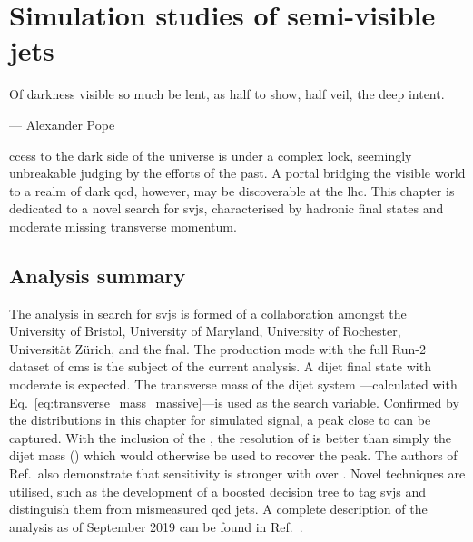 \chapter{Simulation studies of semi-visible jets}
\label{chap:svj}

\epigraph{Of darkness visible so much be lent, as half to show, half veil, the deep intent.}{--- Alexander Pope}

ccess to the dark side of the universe is under a complex lock, seemingly unbreakable judging by the efforts of the past. A portal bridging the visible world to a realm of dark \acrshort{qcd}, however, may be discoverable at the \acrshort{lhc}. This chapter is dedicated to a novel search for \glspl{svj}, characterised by hadronic final states and moderate missing transverse momentum.






\section{Analysis summary}
\label{sec:svj_overview}

The analysis in search for \glspl{svj} is formed of a collaboration amongst the University of Bristol, University of Maryland, University of Rochester, Universit\"{a}t Z\"{u}rich, and the \acrfull{fnal}. The \schannel production mode with the full Run-2 dataset of \acrshort{cms} is the subject of the current analysis. A dijet final state with moderate \ptmiss is expected. The transverse mass of the dijet system \mT---calculated with Eq.~\ref{eq:transverse_mass_massive}---is used as the search variable. Confirmed by the distributions in this chapter for simulated signal, a peak close to \mZprime can be captured. With the inclusion of the \ptmiss, the resolution of \mT is better than simply the dijet mass (\mjj) which would otherwise be used to recover the peak. The authors of Ref.~also demonstrate that sensitivity is stronger with \mT over \mjj. Novel techniques are utilised, such as the development of a boosted decision tree to tag \glspl{svj} and distinguish them from mismeasured \acrshort{qcd} \glspl{jet}. A complete description of the \schannel analysis as of September 2019 can be found in Ref.~. %

